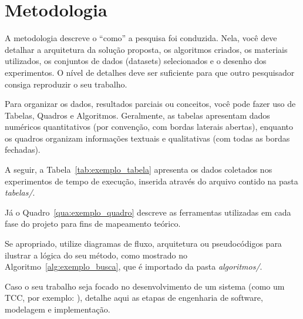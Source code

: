 \section{Metodologia}
\label{sec:metodologia}

A metodologia descreve o ``como'' a pesquisa foi conduzida. Nela, você deve detalhar a arquitetura da solução proposta, os algoritmos criados, os materiais utilizados, os conjuntos de dados (datasets) selecionados e o desenho dos experimentos. O nível de detalhes deve ser suficiente para que outro pesquisador consiga reproduzir o seu trabalho.

Para organizar os dados, resultados parciais ou conceitos, você pode fazer uso de Tabelas, Quadros e Algoritmos. Geralmente, as tabelas apresentam dados numéricos quantitativos (por convenção, com bordas laterais abertas), enquanto os quadros organizam informações textuais e qualitativas (com todas as bordas fechadas). 

A seguir, a Tabela~\ref{tab:exemplo_tabela} apresenta os dados coletados nos experimentos de tempo de execução, inserida através do arquivo contido na pasta \textit{tabelas/}.



Já o Quadro~\ref{qua:exemplo_quadro} descreve as ferramentas utilizadas em cada fase do projeto para fins de mapeamento teórico.



Se apropriado, utilize diagramas de fluxo, arquitetura ou pseudocódigos para ilustrar a lógica do seu método, como mostrado no Algoritmo~\ref{alg:exemplo_busca}, que é importado da pasta \textit{algoritmos/}.



Caso o seu trabalho seja focado no desenvolvimento de um sistema (como um TCC, por exemplo: \cite{tcc_exemplo}), detalhe aqui as etapas de engenharia de software, modelagem e implementação.
